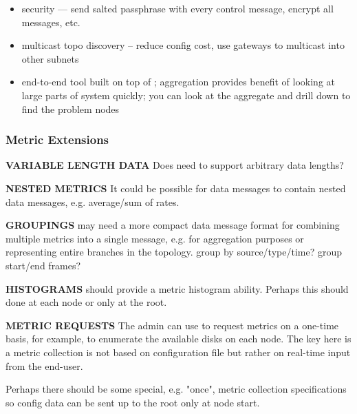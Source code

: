 \begin{itemize}
\item security --- send salted passphrase with every control message, encrypt all messages, etc.

\item multicast topo discovery -- reduce config cost, use gateways to multicast into other subnets

\item end-to-end tool built on top of \dcamp; aggregation provides benefit of looking at large parts of system quickly;
you can look at the aggregate and drill down to find the problem nodes

\end{itemize}

\subsubsection{Metric Extensions}

\textbf{VARIABLE LENGTH DATA}
Does \dcamp need to support arbitrary data lengths?

\textbf{NESTED METRICS}
It could be possible for data messages to contain nested data messages, e.g. average/sum of rates.

\textbf{GROUPINGS}
\dcamp may need a more compact data message format for combining multiple metrics into a single message, e.g. for
aggregation purposes or representing entire branches in the topology.
group by source/type/time?
group start/end frames?

\textbf{HISTOGRAMS}
\dcamp should provide a metric histogram ability. Perhaps this should done at each node or only at the root.

\textbf{METRIC REQUESTS}
The admin can use \dcamp to request metrics on a one-time basis, for example, to enumerate the available disks on each
node. The key here is a metric collection is not based on configuration file but rather on real-time input from the
end-user.

Perhaps there should be some special, e.g. "once", metric collection specifications so config data can be sent up to the
root only at node start.

